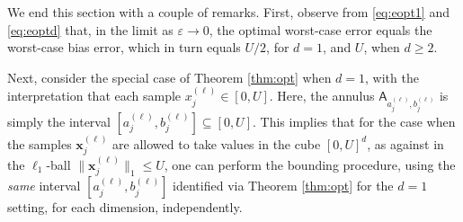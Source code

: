 \documentclass[conference,letterpaper]{IEEEtran}
\newtheorem{lemma}{Lemma}[section]
\theoremstyle{remark}
\theoremstyle{definition}
\begin{document}
%	
We end this section with a couple of remarks. First, observe from \eqref{eq:eopt1} and \eqref{eq:eoptd} that, in the limit as $\varepsilon\to 0$, the optimal worst-case error equals the worst-case bias error, which in turn equals $U/2$, for $d=1$, and $U$, when $d\geq 2$.

Next, consider the special case of Theorem \ref{thm:opt} when $d=1$, with the interpretation that each sample $x_j^{(\ell)}\in [0,U]$. Here, the annulus $\mathsf{A}_{a_j^{(\ell)},b_j^{(\ell)}}$ is simply the interval $[a_j^{(\ell)}, b_j^{(\ell)}]\subseteq [0,U]$. This implies that for the case when the samples $\mathbf{x}_j^{(\ell)}$ are allowed to take values in the cube $[0,U]^d$, as against in the $\ell_1$-ball $\lVert \mathbf{x}_j^{(\ell)}\rVert_1\leq U$, one can perform the bounding procedure, using the \emph{same} interval $[a_j^{(\ell)}, b_j^{(\ell)}]$ identified via Theorem \ref{thm:opt} for the $d=1$ setting, for each dimension, independently.
	
\end{document}
